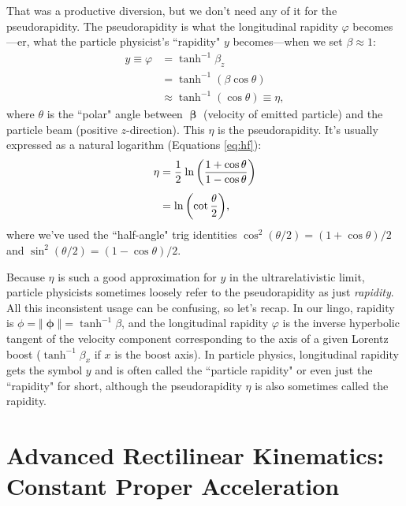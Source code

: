 \documentclass[12pt]{article}
\newcommand{\vvbeta}{\bm{\upbeta}}
\begin{document}
That was a productive diversion, but we don't need any of it for the pseudorapidity. The pseudorapidity is what the longitudinal rapidity $\varphi$ becomes---er, what the particle physicist's ``rapidity" $y$ becomes---when we set $\beta \approx 1$:
\begin{equation*}
\begin{aligned}
y \equiv \varphi &= \tanh^{-1} \beta_z \\
&= \tanh^{-1} ( \beta \cos{\theta} ) \\
& \approx  \tanh^{-1} ( \cos{\theta} ) \equiv \eta ,
\end{aligned}
\end{equation*}
where $\theta$ is the ``polar" angle between $\vvbeta$ (velocity of emitted particle) and the particle beam (positive $z$-direction). This $\eta$ is the pseudorapidity. It's usually expressed as a natural logarithm (Equations \ref{eq:hf}):
\begin{equation*}
\begin{split}
\eta &= \dfrac{1}{2} \mkern1mu \ln{ \left( \dfrac{1 + \cos{\theta}}{1 - \cos{\theta}} \right) } \\[3pt]
&= \ln{ \left( \cot {\dfrac{\theta}{2}} \right) },
\end{split}
\end{equation*}
where we've used the ``half-angle" trig identities $\cos^2{(\theta / 2)} = (1 + \cos{\theta})/2$ and $\sin^2{(\theta / 2)} = (1 - \cos{\theta})/2$.

Because $\eta$ is such a good approximation for $y$ in the ultrarelativistic limit, particle physicists sometimes loosely refer to the pseudorapidity as just \emph{rapidity}. All this inconsistent usage can be confusing, so let's recap. In our lingo, rapidity is $\phi = \Vert \bm{\upphi} \Vert = \tanh^{-1}{\beta}$, and the longitudinal rapidity $\varphi$ is the inverse hyperbolic tangent of the velocity component corresponding to the axis of a given Lorentz boost ($\tanh^{-1}{\beta_x}$ if $x$ is the boost axis). In particle physics, longitudinal rapidity gets the symbol $y$ and is often called the ``particle rapidity" or even just the ``rapidity" for short, although the pseudorapidity $\eta$ is also sometimes called the rapidity.


\section{Advanced Rectilinear Kinematics:\\ Constant Proper Acceleration}\label{sec:ak}
\end{document}
